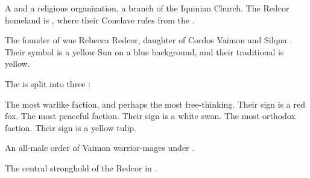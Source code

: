\begin{gloss}
\begin{subgloss}
  \begin{comment}
  \subparagraph{Redcor}
  \end{comment}
  A \VaimonClan and a religious organization, a branch of the Iquinian Church. 
  The Redcor homeland is \Redce, where their Conclave rules from the \TopazChateau. 
  
  The founder of \ClanRedcor was Rebecca Redcor, daughter of Cordos Vaimon and Silqua \Delaen. 
  Their symbol is a yellow Sun on a blue background, and their traditional \colour is yellow. 
  
  The \vclan is split into three \RedcorHouses: 
  
  \begin{subgloss}
    \gitem{\TheFoxFaction} 
    \index{\FoxFaction} 
      The most warlike faction, and perhaps the most free-thinking. 
      Their sign is a red fox. 
    \gitem{\TheSwanFaction} 
    \index{\SwanFaction} 
      The most peaceful faction. 
      Their sign is a white swan. 
    \gitem{\TheTulipFaction} 
    \index{\TulipFaction} 
      The most orthodox faction. 
      Their sign is a yellow tulip.
  \end{subgloss}
  
  
  
  
  
  \begin{comment}
  \subparagraph{\gandierre}
  \end{comment}
  \gitem[\gandierres]{\gandierre}
  An all-male order of Vaimon warrior-mages under \ClanRedcor. 
  
  
  
  
  
  
  
  
  
  
  \begin{comment}
  \subparagraph{\TopazChateau}
  \end{comment}
  \gitem{\TopazChateau}
  The central stronghold of the Redcor in \Redce. 
\end{subgloss}









\end{gloss}
